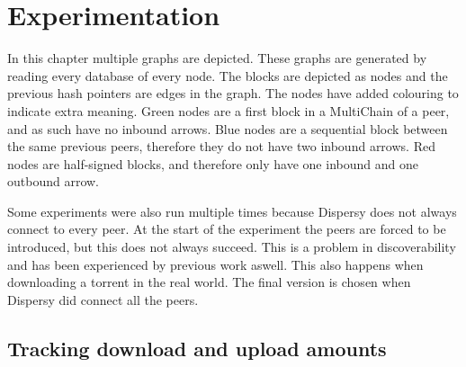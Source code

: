 \chapter{Experimentation}

In this chapter multiple graphs are depicted.
These graphs are generated by reading every database of every node.
The blocks are depicted as nodes and the previous hash pointers are edges in the graph.
The nodes have added colouring to indicate extra meaning.
Green nodes are a first block in a MultiChain of a peer,
and as such have no inbound arrows.
Blue nodes are a sequential block between the same previous peers,
therefore they do not have two inbound arrows.
Red nodes are half-signed blocks,
and therefore only have one inbound and one outbound arrow.

Some experiments were also run multiple times because Dispersy does not always connect to every peer.
At the start of the experiment the peers are forced to be introduced,
but this does not always succeed.
This is a problem in discoverability and has been experienced by previous work aswell\cite{ruigrok-anonymous}.
This also happens when downloading a torrent in the real world.
The final version is chosen when Dispersy did connect all the peers.



\section{Tracking download and upload amounts}







